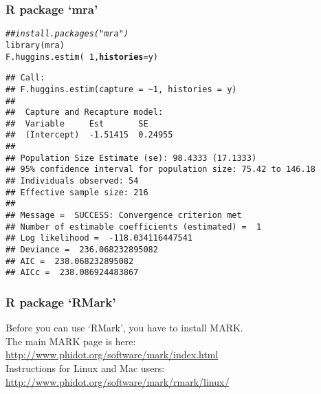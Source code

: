 \documentclass[color=usenames,dvipsnames]{beamer}\usepackage[]{graphicx}\usepackage[]{color}
\makeatletter
\newcommand{\hlnum}[1]{\textcolor[rgb]{0.69,0.494,0}{#1}}%
\newcommand{\hlcom}[1]{\textcolor[rgb]{0.514,0.506,0.514}{\textit{#1}}}%
\newcommand{\hlopt}[1]{\textcolor[rgb]{0,0,0}{#1}}%
\newcommand{\hlstd}[1]{\textcolor[rgb]{0,0,0}{#1}}%
\newcommand{\hlkwc}[1]{\textcolor[rgb]{0,0,0}{\textbf{#1}}}%
\newcommand{\hlkwd}[1]{\textcolor[rgb]{0.004,0.004,0.506}{#1}}%
\newenvironment{kframe}{%
 \def\at@end@of@kframe{}%
 \ifinner\ifhmode%
  \def\at@end@of@kframe{\end{minipage}}%
  \begin{minipage}{\columnwidth}%
 \fi\fi%
 \def\FrameCommand##1{\hskip\@totalleftmargin \hskip-\fboxsep
 \colorbox{shadecolor}{##1}\hskip-\fboxsep
     \hskip-\linewidth \hskip-\@totalleftmargin \hskip\columnwidth}%
 \MakeFramed {\advance\hsize-\width
   \@totalleftmargin\z@ \linewidth\hsize
   \@setminipage}}%
 {\par\unskip\endMakeFramed%
 \at@end@of@kframe}
\newenvironment{knitrout}{}{} %
\makeatother
\begin{document}
\begin{frame}[fragile]
  \frametitle{R package `mra'}
\begin{knitrout}\scriptsize
{}\color{fgcolor}\begin{kframe}
\begin{alltt}
\hlcom{## install.packages("mra")}
\hlkwd{library}\hlstd{(mra)}
\hlkwd{F.huggins.estim}\hlstd{(}\hlopt{~}\hlnum{1}\hlstd{,} \hlkwc{histories}\hlstd{=y)}
\end{alltt}
\begin{verbatim}
## Call:
## F.huggins.estim(capture = ~1, histories = y)
## 
##  Capture and Recapture model:
##  Variable     Est       SE     
##  (Intercept)  -1.51415  0.24955 
## 
## Population Size Estimate (se): 98.4333 (17.1333)
## 95% confidence interval for population size: 75.42 to 146.18
## Individuals observed: 54
## Effective sample size: 216
## 
## Message =  SUCCESS: Convergence criterion met
## Number of estimable coefficients (estimated) =  1
## Log likelihood =  -118.034116447541
## Deviance =  236.068232895082
## AIC =  238.068232895082
## AICc =  238.086924483867
\end{verbatim}
\end{kframe}
\end{knitrout}
\end{frame}



\begin{frame}
  \frametitle{R package `RMark'}
  Before you can use `RMark', you have to install MARK.  \\
  \vfill
  The main MARK page is here: \\
  \url{http://www.phidot.org/software/mark/index.html}  \\
  \vfill
  Instructions for Linux and Mac users: \\
  \url{http://www.phidot.org/software/mark/rmark/linux/}
\end{frame}
\end{document}
